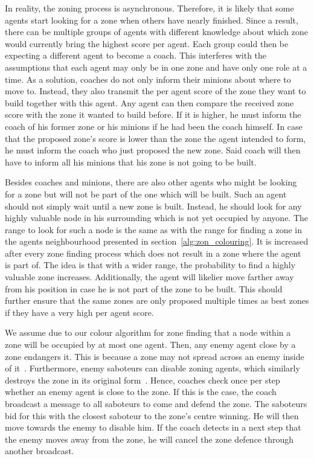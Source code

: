 In reality, the zoning process is asynchronous. Therefore, it is likely that some agents start looking for a zone when others have nearly finished. Since a result, there can be multiple groups of agents with different knowledge about which zone would currently bring the highest score per agent. Each group could then be expecting a different agent to become a coach. This interferes with the assumptions that each agent may only be in one zone and have only one role at a time. As a solution, coaches do not only inform their minions about where to move to. Instead, they also transmit the per agent score of the zone they want to build together with this agent. Any agent can then compare the received zone score with the zone it wanted to build before. If it is higher, he must inform the coach of his former zone or his minions if he had been the coach himself. In case that the proposed zone's score is lower than the zone the agent intended to form, he must inform the coach who just proposed the new zone. Said coach will then have to inform all his minions that his zone is not going to be built.

Besides coaches and minions, there are also other agents who might be looking for a zone but will not be part of the one which will be built. Such an agent should not simply wait until a new zone is built. Instead, he should look for any highly valuable node in his surrounding which is not yet occupied by anyone. The range to look for such a node is the same as with the range for finding a zone in the agents neighbourhood presented in section~\ref{alg:zon_colouring}. It is increased after every zone finding process which does not result in a zone where the agent is part of. The idea is that with a wider range, the probability to find a highly valuable zone increases. Additionally, the agent will likelier move farther away from his position in case he is not part of the zone to be built. This should further ensure that the same zones are only proposed multiple times as best zones if they have a very high per agent score.

We assume due to our colour algorithm for zone finding that a node within a zone will be occupied by at most one agent. Then, any enemy agent close by a zone endangers it. This is because a zone may not spread across an enemy inside of it~\cite{ahlbrecht_mapc_2014}. %
Furthermore, enemy saboteurs can disable zoning agents, which similarly destroys the zone in its original form~\cite{ahlbrecht_mapc_2014}. %
Hence, coaches check once per step whether an enemy agent is close to the zone. If this is the case, the coach broadcast a message to all saboteurs to come and defend the zone. The saboteurs bid for this with the closest saboteur to the zone's centre winning. He will then move towards the enemy to disable him. If the coach detects in a next step that the enemy moves away from the zone, he will cancel the zone defence through another broadcast.


